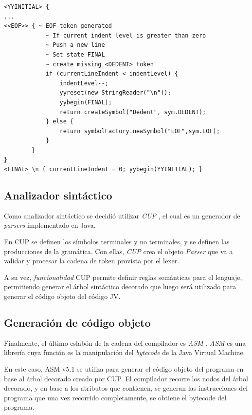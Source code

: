 \documentclass[spanish]{article}
\begin{document}
\clearpage
            \begin{lstlisting}
<YYINITIAL> {
...
<<EOF>> { ~ EOF token generated
            ~ If current indent level is greater than zero
            ~ Push a new line
            ~ Set state FINAL
            ~ create missing <DEDENT> token
			if (currentLineIndent < indentLevel) {
				indentLevel--;
				yyreset(new StringReader("\n"));
				yybegin(FINAL);
				return createSymbol("Dedent", sym.DEDENT);
			} else {
				return symbolFactory.newSymbol("EOF",sym.EOF);
			}
		}
}
<FINAL> \n { currentLineIndent = 0; yybegin(YYINITIAL); }
            \end{lstlisting}
        \subsection{Analizador sintáctico}
            \par Como analizador sintáctico se decidió utilizar \textit{CUP} \cite{cup_home}, el cual es un generador de \textit{parsers} implementado en Java. 
            \par En CUP se definen los símbolos terminales y no terminales, y se definen las producciones de la gramática. Con ellas, \textit{CUP} crea el objeto \textit{Parser} que va a validar y procesar la cadena de token provista por el lexer.
            \par A su vez, \textit{funcionalidad} CUP permite definir reglas semánticas para el lenguaje, permitiendo generar el árbol sintáctico decorado que luego será utilizado para generar el código objeto del código JV.

        \subsection{Generación de código objeto}
            \par Finalmente, el último eslabón de la cadena del compilador es \textit{ASM} \cite{asm_guide}. \textit{ASM} es una librería cuya función es la manipulación del \textit{bytecode} de la Java Virtual Machine.
            \par En este caso, ASM v5.1 \cite{asm_doc} se utiliza para generar el código objeto  del programa en base al árbol decorado creado por CUP. El compilador recorre los nodos del árbol decorado, y en base a los atributos que contienen, se generan las instrucciones del programa que una vez recorrido completamente, se obtiene el bytecode del programa.

        \clearpage
\end{document}
